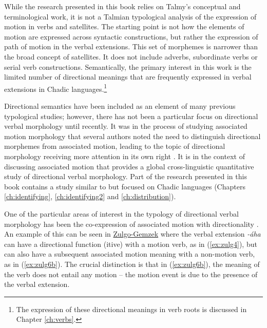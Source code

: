 While the research presented in this book relies on Talmy's conceptual and terminological work, it is not a Talmian typological analysis of the expression of motion in verbs and satellites. The starting point is not how the elements of motion are expressed across syntactic constructions, but rather the expression of path of motion in the verbal extensions. This set of morphemes is narrower than the broad concept of satellites. It does not include adverbs, subordinate verbs or serial verb constructions. Semantically, the primary interest in this work is the limited number of directional meanings that are frequently expressed in verbal extensions in Chadic languages.\footnote{The expression of these directional meanings in verb roots is discussed in Chapter \ref{ch:verbs}.}
 
Directional semantics have been included as an element of many previous typological studies; however, there has not been a particular focus on directional verbal morphology until recently. It was in the process of studying associated motion morphology that several authors noted the need to distinguish directional morphemes from associated motion, leading to the topic of directional morphology receiving more attention in its own right \citep{bourdinMarkingDirectionalDeixis2006,belkadiAssociatedMotionDeictic2015,guillaumeAssociatedMotionSouth2016}. It is in the context of discussing associated motion that \citet{rossCrosslinguisticSurveyAssociated2021,rossPseudocoordinationSerialVerb2021} provides a global cross-linguistic quantitative study of directional verbal morphology. Part of the research presented in this book contains a study similar to \citet{rossCrosslinguisticSurveyAssociated2021} but focused on Chadic languages (Chapters \ref{ch:identifying}, \ref{ch:identifying2} and \ref{ch:distribution}).

One of the particular areas of interest in the typology of directional verbal morphology has been the co-expression of associated motion with directionality \citep{dryerAssociatedMotionDirectionals2021,belkadiDeicticDirectionalityAssociated2021}. An example of this can be seen in \hyperref[zulg]{Zulgo-Gemzek} where the verbal extension \textit{-áha} can have a directional function (itive) with a motion verb, as in (\ref{ex:zulg4}), but can also have a subsequent associated motion meaning with a non-motion verb, as in (\ref{ex:zulg6b}). The crucial distinction is that in (\ref{ex:zulg6b}), the meaning of the verb does not entail any motion -- the motion event is due to the presence of the verbal extension. 

